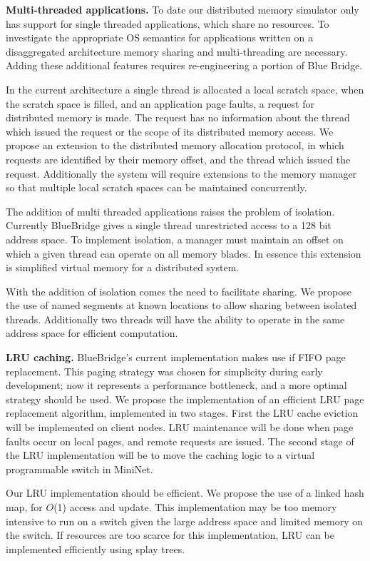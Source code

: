 \textbf{Multi-threaded applications.} To date our
distributed memory simulator only has support for single threaded
applications, which share no resources. To investigate the appropriate
OS semantics for applications written on a disaggregated architecture
memory sharing and multi-threading are necessary. Adding these
additional features requires re-engineering a portion of Blue Bridge.

In the current architecture a single thread is allocated a local
scratch space, when the scratch space is filled, and an application
page faults, a request for distributed memory is made. The request has
no information about the thread which issued the request or the scope
of its distributed memory access. We propose an extension to the
distributed memory allocation protocol, in which requests are
identified by their memory offset, and the thread which issued the
request. Additionally the system will require extensions to the memory
manager so that multiple local scratch spaces can be maintained
concurrently.

The addition of multi threaded applications raises the problem of
isolation. Currently BlueBridge gives a single thread unrestricted
access to a 128 bit address space. To implement isolation, a manager
must maintain an offset on which a given thread can operate on all
memory blades. In essence this extension is simplified virtual memory
for a distributed system.

With the addition of isolation comes the need to facilitate sharing.
We propose the use of named segments at known locations to allow
sharing between isolated threads. Additionally two threads will have
the ability to operate in the same address space for efficient
computation.

\textbf{LRU caching.} BlueBridge's current implementation
makes use if FIFO page replacement. This paging strategy was chosen
for simplicity during early development; now it represents a
performance bottleneck, and a more optimal strategy should be used. We
propose the implementation of an efficient LRU page replacement
algorithm, implemented in two stages. First the LRU cache eviction
will be implemented on client nodes. LRU maintenance will be done when
page faults occur on local pages, and remote requests are issued. The
second stage of the LRU implementation will be to move the caching
logic to a virtual programmable switch in MiniNet.

Our LRU implementation should be efficient. We propose the use of a
linked hash map, for $O$(1) access and update. This implementation may
be too memory intensive to run on a switch given the large address
space and limited memory on the switch. If resources are too scarce
for this implementation, LRU can be implemented efficiently using
splay trees.

